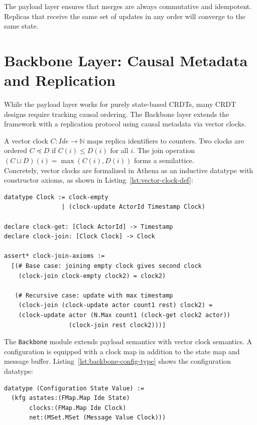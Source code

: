 The payload layer ensures that merges are always commutative and idempotent. Replicas that receive the same set of updates in any order will converge to the same state.

\section{Backbone Layer: Causal Metadata and Replication}
\label{sec:framework-backbone}

While the payload layer works for purely state-based CRDTs, many CRDT designs require tracking causal ordering. The Backbone layer extends the framework with a replication protocol using causal metadata via vector clocks.

A vector clock $C: Ide \to \mathbb{N}$ maps replica identifiers to counters. Two clocks are ordered $C \preceq D$ if $C(i) \leq D(i)$ for all $i$. The join operation $(C \sqcup D)(i) = \max(C(i), D(i))$ forms a semilattice.\\

Concretely, vector clocks are formalized in Athena as an inductive datatype with constructor axioms, as shown in Listing~\ref{lst:vector-clock-def}:\\

\begin{lstlisting}[language=Athena,style=athena,label={lst:vector-clock-def},caption={Vector clock definition: inductive datatype with operations}]
datatype Clock := clock-empty 
                | (clock-update ActorId Timestamp Clock)

declare clock-get: [Clock ActorId] -> Timestamp
declare clock-join: [Clock Clock] -> Clock

assert* clock-join-axioms :=
  [(# Base case: joining empty clock gives second clock
    (clock-join clock-empty clock2) = clock2)
   
   (# Recursive case: update with max timestamp
    (clock-join (clock-update actor count1 rest) clock2) =
    (clock-update actor (N.Max count1 (clock-get clock2 actor))
                  (clock-join rest clock2)))]
\end{lstlisting}

The \texttt{Backbone} module extends payload semantics with vector clock semantics. A configuration is equipped with a clock map in addition to the state map and message buffer. Listing~\ref{lst:backbone-config-type} shows the configuration datatype:

\begin{lstlisting}[language=Athena,style=athena,label={lst:backbone-config-type},caption={Configuration datatype for Backbone module}]
datatype (Configuration State Value) :=
  (kfg astates:(FMap.Map Ide State)
       clocks:(FMap.Map Ide Clock)
       net:(MSet.MSet (Message Value Clock)))
\end{lstlisting}

